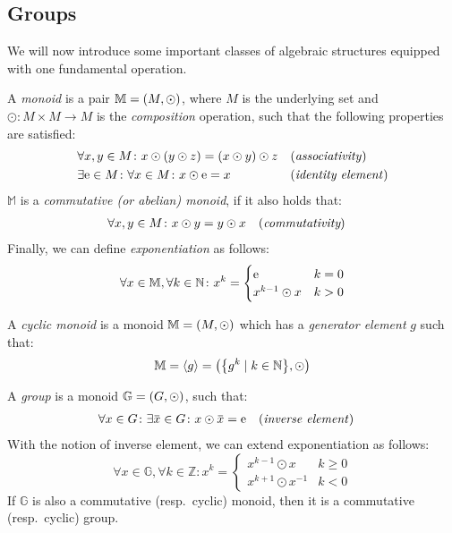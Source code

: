 \subsection{Groups}
We will now introduce some important classes of algebraic structures equipped with one fundamental 
operation. 
\begin{definition}[Monoid]
  A \emph{monoid} is a pair \(\mathbb{M} = \Tuple{M, \odot} \), where \(M\) is the 
  underlying set and \(\odot\colon M \times M \to M\) is the \emph{composition} 
  operation, such that the following properties are satisfied: 
  \begin{align*}
    & \forall x,y \in M\colon x \odot \Parens*{y \odot z} = \Parens*{x \odot y} \odot z
      && \textnormal{(\emph{associativity})} \\
    & \exists \id \in M\colon \forall x \in M\colon x \odot \id = x
      && \textnormal{(\emph{identity element})}
  \end{align*}
  \(\mathbb{M}\) is a \emph{commutative (or abelian) monoid}, if it also holds that:
  \begin{align*}
    & \forall x,y \in M\colon x \odot y = y \odot x && (\emph{commutativity})
  \end{align*}
  Finally, we can define \emph{exponentiation} as follows:
  \begin{equation}\label{eq:exponentiation}    
    \forall x \in \mathbb{M}, \forall k \in \mathbb{N}\colon x^{k} = 
    \begin{cases}
      \id & k = 0 \\
      x^{k-1} \odot x & k > 0
    \end{cases}
  \end{equation}
\end{definition}

\begin{definition}
  A \emph{cyclic monoid} is a monoid \(\mathbb{M} = \Tuple{M, \odot}\) which has a 
  \emph{generator element} \(g\) such that:
  \[\mathbb{M} = \gengroup{g} = \Tuple{\Set{g^k \mid k \in \mathbb{N}}, \odot} \]
\end{definition}

\begin{definition}[Group]
  A \emph{group} is a monoid \(\mathbb{G} = \Tuple{G, \odot} \), such that: 
  \begin{align*}    
    & \forall x \in G\colon \exists \inv{x} \in G\colon x \odot \inv{x} = \id
    && \textnormal{(\emph{inverse element})}
  \end{align*}
  With the notion of inverse element, we can extend exponentiation as follows:
  \[
    \forall x \in \mathbb{G},\forall k \in \mathbb{Z}\colon x^k =
    \begin{cases}
      x^{k-1} \odot x & k \ge 0 \\
      x^{k+1} \odot x^{-1} & k < 0
    \end{cases}
  \]
  If \(\mathbb{G}\) is also a commutative (resp.\ cyclic) monoid, then it is a 
  commutative (resp.\ cyclic) group.
\end{definition}

